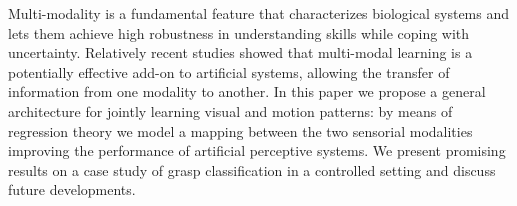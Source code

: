 Multi-modality is a fundamental feature that characterizes biological systems
and lets them achieve high robustness in understanding skills while coping with
uncertainty.
Relatively recent studies showed that multi-modal learning
is a potentially effective add-on to artificial systems, allowing
the transfer of information from one modality to another.
In this paper we propose a general architecture for jointly learning visual and motion patterns:
by means of regression theory we model a mapping between the two sensorial modalities improving
the performance of artificial perceptive systems.
We present promising results on a case study of grasp classification in a controlled setting
and discuss future developments.


